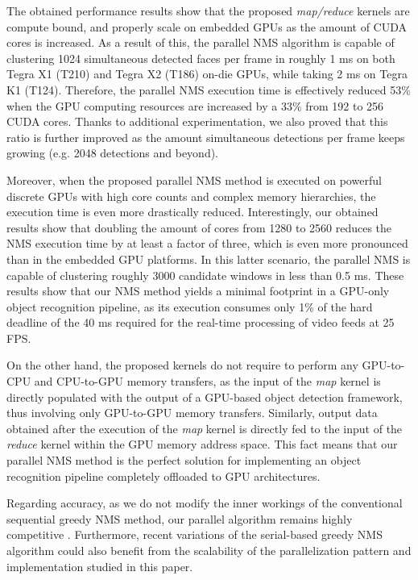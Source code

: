 The obtained performance results show that the proposed \emph{map/reduce} kernels are compute bound, and properly scale on embedded 
GPUs as the amount of CUDA cores is increased. As a result of this, the parallel NMS algorithm is capable of clustering 1024 simultaneous 
detected faces per frame in roughly 1 ms on both Tegra X1 (T210) and Tegra X2 (T186) on-die GPUs, while taking 2 ms on Tegra K1 (T124). 
Therefore, the parallel NMS execution time is effectively reduced 53\% when the GPU computing resources are increased by a 33\% from 
192 to 256 CUDA cores. Thanks to additional experimentation, we also proved that this ratio is further improved as the amount 
simultaneous detections per frame keeps growing (e.g. 2048 detections and beyond).

Moreover, when the proposed parallel NMS method is executed on powerful discrete GPUs with high core counts and complex memory hierarchies, the 
execution time is even more drastically reduced. Interestingly, our obtained results show that doubling the amount of cores from 1280 to 2560 reduces the NMS 
execution time by at least a factor of three, which is even more pronounced than in the embedded GPU platforms. In this latter scenario, 
the parallel NMS is capable of clustering roughly 3000 candidate windows in less than 0.5 ms. These results show that our NMS method yields a minimal 
footprint in a GPU-only object recognition pipeline, as its execution consumes only 1\% of the hard deadline of the 40 ms required for the 
real-time processing of video feeds at 25 FPS.

On the other hand, the proposed kernels do not require to perform any GPU-to-CPU and CPU-to-GPU memory transfers, as the input of the \emph{map} kernel is directly 
populated with the output of a GPU-based object detection framework, thus involving only GPU-to-GPU memory transfers. Similarly, output data obtained after the execution 
of the \emph{map} kernel is directly fed to the input of the \emph{reduce} kernel within the GPU memory address space. This fact means that our parallel NMS method 
is the perfect solution for implementing an object recognition pipeline completely offloaded to GPU architectures.  

Regarding accuracy, as we do not modify the inner workings of the conventional sequential greedy NMS method, our parallel algorithm 
remains highly competitive \cite{bodla2017soft}. Furthermore, recent variations of the serial-based greedy NMS 
algorithm \cite{liu2019adaptive,salscheider2020featurenms} could also benefit from the scalability of the parallelization pattern and 
implementation studied in this paper.

